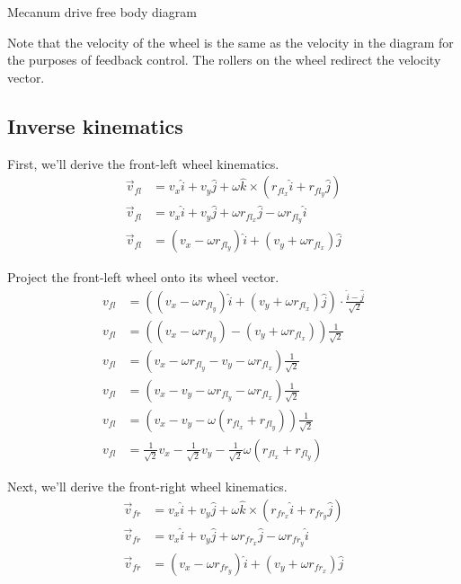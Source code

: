 \begin{bookfigure}
  \caption{Mecanum drive free body diagram}
  \label{fig:mecanum_drive_fbd}
\end{bookfigure}

Note that the velocity of the wheel is the same as the velocity in the diagram
for the purposes of feedback control. The rollers on the wheel redirect the
velocity vector.

\subsection{Inverse kinematics}

First, we'll derive the front-left wheel kinematics.
\begin{align*}
  \vec{v}_{fl} &= v_x \hat{i} + v_y \hat{j} +
    \omega \hat{k} \times (r_{fl_x} \hat{i} + r_{fl_y} \hat{j}) \\
  \vec{v}_{fl} &= v_x \hat{i} + v_y \hat{j} +
    \omega r_{fl_x} \hat{j} - \omega r_{fl_y} \hat{i} \\
  \vec{v}_{fl} &= (v_x - \omega r_{fl_y}) \hat{i} +
    (v_y + \omega r_{fl_x}) \hat{j}
\end{align*}

Project the front-left wheel onto its wheel vector.
\begin{align}
  v_{fl} &= ((v_x - \omega r_{fl_y}) \hat{i} + (v_y + \omega r_{fl_x}) \hat{j})
    \cdot \frac{\hat{i} - \hat{j}}{\sqrt{2}} \nonumber \\
  v_{fl} &= ((v_x - \omega r_{fl_y}) - (v_y + \omega r_{fl_x}))
    \frac{1}{\sqrt{2}} \nonumber \\
  v_{fl} &= (v_x - \omega r_{fl_y} - v_y - \omega r_{fl_x})
    \frac{1}{\sqrt{2}} \nonumber \\
  v_{fl} &= (v_x - v_y - \omega r_{fl_y} - \omega r_{fl_x})
    \frac{1}{\sqrt{2}} \nonumber \\
  v_{fl} &= (v_x - v_y - \omega (r_{fl_x} + r_{fl_y}))
    \frac{1}{\sqrt{2}} \nonumber \\
  v_{fl} &= \frac{1}{\sqrt{2}} v_x - \frac{1}{\sqrt{2}} v_y -
    \frac{1}{\sqrt{2}} \omega (r_{fl_x} + r_{fl_y})
\end{align}

Next, we'll derive the front-right wheel kinematics.
\begin{align*}
  \vec{v}_{fr} &= v_x \hat{i} + v_y \hat{j} +
    \omega \hat{k} \times (r_{fr_x} \hat{i} + r_{fr_y} \hat{j}) \\
  \vec{v}_{fr} &= v_x \hat{i} + v_y \hat{j} +
    \omega r_{fr_x} \hat{j} - \omega r_{fr_y} \hat{i} \\
  \vec{v}_{fr} &= (v_x - \omega r_{fr_y}) \hat{i} +
    (v_y + \omega r_{fr_x}) \hat{j}
\end{align*}


